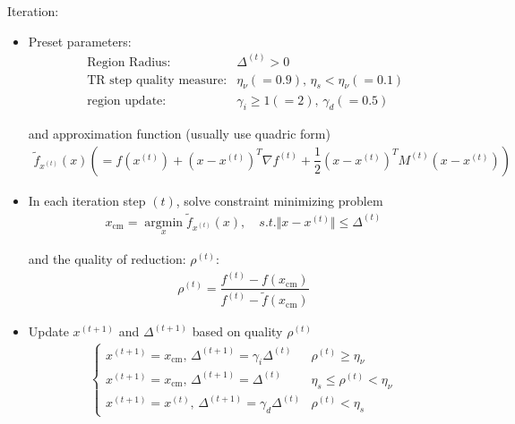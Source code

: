     \begin{point}
        Iteration:
    \end{point}

    \begin{itemize}[topsep=2pt,itemsep=0pt]
        \item Preset parameters:
        \begin{align}
            \text{ Region Radius}:&\Delta^{(t)}>0\\
            \text{ TR step quality measure}:& \eta_\nu(=0.9),\, \eta_s<\eta_\nu(=0.1) \\
            \text{ region update}:& \gamma_i\geq 1(=2),\, \gamma_d(=0.5)
        \end{align}
        
        and approximation function (usually use quadric form)
        \begin{align}
            \tilde{f}_{x^{(t)}}\left(x\right) \left(=f(x^{(t)})+ \left(x-x^{(t)}\right)^T\nabla f^{(t)}+\dfrac{1}{2}\left(x-x^{(t)}\right)^TM^{(t)}\left(x-x^{(t)}\right)\right)
        \end{align}
        
        
        \item In each iteration step $ (t) $, solve constraint minimizing problem
        \begin{align}
            x_\mathrm{cm} =\mathop{\arg\min}\limits_{x}\tilde{f}_{x^{(t)}}(x),\quad s.t. \Vert x-x^{(t)} \Vert \leq \Delta^{(t)}
        \end{align}

        and the quality of reduction: $ \rho^{(t)}$:
        \begin{align}
            \rho ^{(t)}=\dfrac{f^{(t)}-f(x_\mathrm{cm} )}{f^{(t)}-\tilde{f}(x_\mathrm{cm} )}
        \end{align}
        \item Update $ x^{(t+1)} $ and $ \Delta ^{(t+1)} $ based on quality $ \rho ^{(t)} $
        \begin{align}
            \begin{cases}
                x^{(t+1)}=x_\mathrm{cm},\,\Delta ^{(t+1)}=\gamma  _i\Delta ^{(t)}& \rho ^{(t)}\geq \eta_\nu\\
                x^{(t+1)}=x_\mathrm{cm},\,\Delta ^{(t+1)}=\Delta ^{(t)}& \eta_s\leq \rho ^{(t)}<\eta_\nu\\
                x^{(t+1)}=x^{(t)},\,\Delta ^{(t+1)}=\gamma_d\Delta ^{(t)}& \rho ^{(t)}<\eta_s
            \end{cases}
        \end{align}

    \end{itemize}



